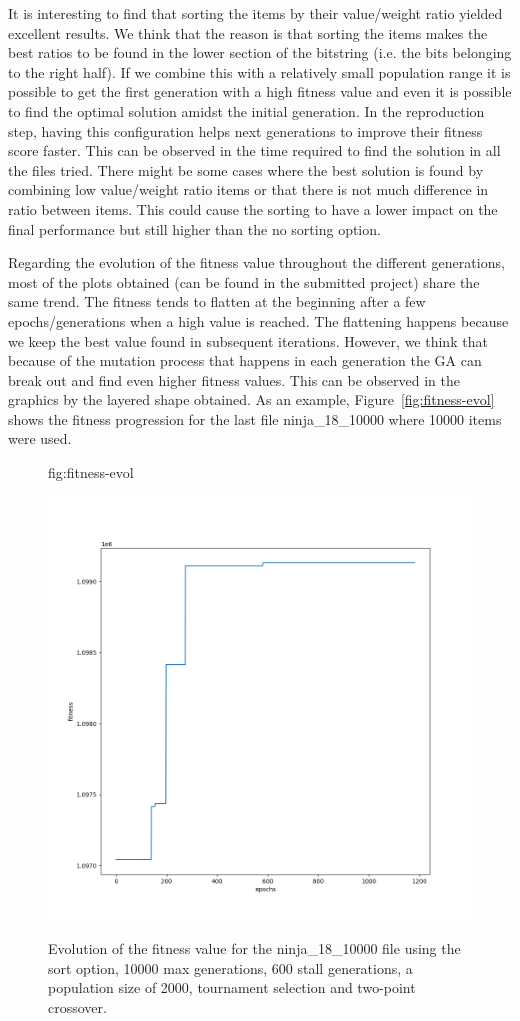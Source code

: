 \documentclass[anon]{CI}
\begin{document}
It is interesting to find that sorting the items by their value/weight ratio yielded excellent results. We think that the reason is that sorting the items makes the best ratios to be found in the lower section of the bitstring (i.e. the bits belonging to the right half). If we combine this with a relatively small population range it is possible to get the first generation with a high fitness value and even it is possible to find the optimal solution amidst the initial generation. In the reproduction step, having this configuration helps next generations to improve their fitness score faster. This can be observed in the time required to find the solution in all the files tried. There might be some cases where the best solution is found by combining low value/weight ratio items or that there is not much difference in ratio between items. This could cause the sorting to have a lower impact on the final performance but still higher than the no sorting option.

Regarding the evolution of the fitness value throughout the different generations, most of the plots obtained (can be found in the submitted project) share the same trend. The fitness tends to flatten at the beginning after a few epochs/generations when a high value is reached. The flattening happens because we keep the best value found in subsequent iterations. However, we think that because of the mutation process that happens in each generation the GA can break out and find even higher fitness values. This can be observed in the graphics by the layered shape obtained. As an example, Figure~\ref{fig:fitness-evol} shows the fitness progression for the last file ninja\_18\_10000 where 10000 items were used.

\begin{figure}[htbp]
\floatconts
{fig:fitness-evol}
{\caption{Evolution of the fitness value for the ninja\_18\_10000 file using the sort option, 10000 max generations, 600 stall generations, a population
    size of 2000, tournament selection and two-point
    crossover.}}
{\includegraphics[width=.6\textwidth]{images/ninja_18_10000}}
\end{figure}
\end{document}
